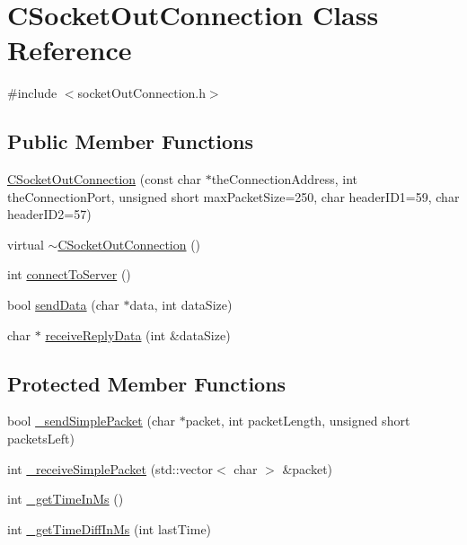 \hypertarget{classCSocketOutConnection}{}\section{C\+Socket\+Out\+Connection Class Reference}
\label{classCSocketOutConnection}


{\ttfamily \#include $<$socket\+Out\+Connection.\+h$>$}

\subsection*{Public Member Functions}
\begin{DoxyCompactItemize}
\item 
\hyperlink{classCSocketOutConnection_a26ac9c4b8a575dfde5a896879fa84fb4}{C\+Socket\+Out\+Connection} (const char $\ast$the\+Connection\+Address, int the\+Connection\+Port, unsigned short max\+Packet\+Size=250, char header\+I\+D1=59, char header\+I\+D2=57)
\item 
virtual \hyperlink{classCSocketOutConnection_a1dec7524a61d96c85b008d6b3423a82a}{$\sim$\+C\+Socket\+Out\+Connection} ()
\item 
int \hyperlink{classCSocketOutConnection_a1be707b8bc47610dbf58443acf270297}{connect\+To\+Server} ()
\item 
bool \hyperlink{classCSocketOutConnection_a9266098d03f6f4f04941dcbc3a1f54f5}{send\+Data} (char $\ast$data, int data\+Size)
\item 
char $\ast$ \hyperlink{classCSocketOutConnection_a0255ab137779ad1ccc5687d579c2d14f}{receive\+Reply\+Data} (int \&data\+Size)
\end{DoxyCompactItemize}
\subsection*{Protected Member Functions}
\begin{DoxyCompactItemize}
\item 
bool \hyperlink{classCSocketOutConnection_aecd4ed7366fe4d26b7aee7c40f2cb149}{\+\_\+send\+Simple\+Packet} (char $\ast$packet, int packet\+Length, unsigned short packets\+Left)
\item 
int \hyperlink{classCSocketOutConnection_a8fe9c6ffe547417d37baa5737dcc6596}{\+\_\+receive\+Simple\+Packet} (std\+::vector$<$ char $>$ \&packet)
\item 
int \hyperlink{classCSocketOutConnection_a48ea2d2223cb127fa3e856f9202400ec}{\+\_\+get\+Time\+In\+Ms} ()
\item 
int \hyperlink{classCSocketOutConnection_a975e026eda1a75091bc618f007f20809}{\+\_\+get\+Time\+Diff\+In\+Ms} (int last\+Time)
\end{DoxyCompactItemize}
